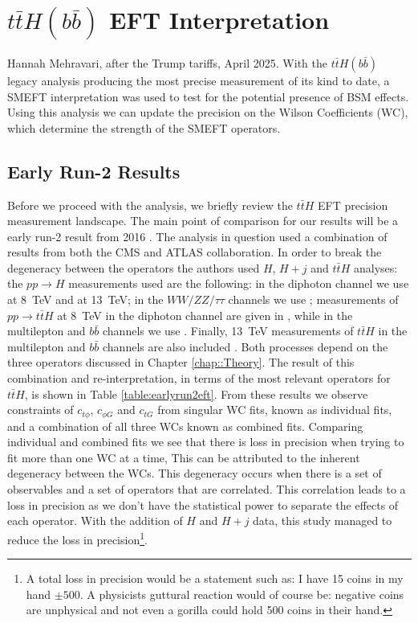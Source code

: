 \chapter{$t\bar{t}H(b\bar{b})$ EFT Interpretation}
\label{chap::tth_eft}
%
{Hannah Mehravari, after the Trump tariffs, April 2025.}
With the $t\bar{t}H(b\bar{b})$ legacy analysis producing the most precise measurement of its kind to date, a SMEFT interpretation was used to test for the potential presence of BSM effects. Using this analysis we can update the precision on the Wilson Coefficients (WC), which determine the strength of the SMEFT operators.
\section{Early Run-2 Results}
Before we proceed with the analysis, we briefly  review the $t\bar{t}H$ EFT precision measurement landscape. The main point of comparison for our results will be a early run-2 result from 2016 \cite{Maltoni:2016yxb}. The analysis in question used a combination of results from both the CMS and ATLAS collaboration. In order to break the degeneracy between the operators the authors used $H$, $H + j$ and $t\bar{t}H$ analyses: the $pp \to H$ measurements used are the following: in the diphoton channel we use \cite{ATLAS_2014,CMS_2014} at 8~TeV and \cite{CMS_2016_gg} at 13~TeV; in the $WW/ZZ/\tau\tau$ channels we use \cite{ATLAS_WW_2015,CMS_WW_2014,ATLAS_ZZ_2015,CMS_ZZ_2014,ATLAS_tau_2015,CMS_tau_2014}; measurements of $pp \to t\bar{t}H$ at 8~TeV in the diphoton channel are given in \cite{CMS_ttH_2014,ATLAS_ttH_2015_gamma}, while in the multilepton and $b\bar{b}$ channels we use \cite{CMS_ttH_2014,ATLAS_ttH_2015_multilepton,ATLAS_ttH_2015_bb}. Finally, 13~TeV measurements of $t\bar{t}H$ in the multilepton and $b\bar{b}$ channels are also included \cite{CMS_ttH_2016_multilepton,CMS_ttH_2016_bb}. Both processes depend on the three operators discussed in Chapter \ref{chap::Theory}. The result of this combination and re-interpretation, in terms of the most relevant operators for $t\bar{t}H$, is shown in Table \ref{table:earlyrun2eft}. From these results we observe constraints of $c_{t\phi}$,  $c_{\phi G}$ and $c_{tG}$ from singular WC fits, known as individual fits, and a combination of all three WCs known as combined fits. Comparing individual and combined fits we see that there is loss in precision when trying to fit more than one WC at a time, This can be attributed to the inherent degeneracy between the WCs. This degeneracy occurs when there is a set of observables and a set of operators that are correlated. This correlation leads to a loss in precision as we don't have the statistical power to separate the effects of each operator. With the addition of $H$ and $H+j$ data, this study managed to reduce the loss in precision\footnote{A total loss in precision would be a statement such as: I have 15 coins in my hand $\pm 500$. A physicists guttural reaction would of course be: negative coins are unphysical and not even a gorilla could hold 500 coins in their hand.}. 
